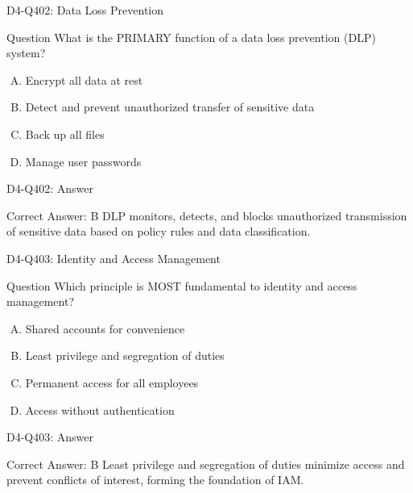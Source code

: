 \documentclass{beamer}
\begin{document}
\begin{frame}{D4-Q402: Data Loss Prevention}
	\begin{block}{Question}
		What is the PRIMARY function of a data loss prevention (DLP) system?
	\end{block}
	\begin{enumerate}[(A)]
		\item Encrypt all data at rest
		\item Detect and prevent unauthorized transfer of sensitive data
		\item Back up all files
		\item Manage user passwords
	\end{enumerate}
\end{frame}
\begin{frame}{D4-Q402: Answer}
	\begin{block}{Correct Answer: B}
		DLP monitors, detects, and blocks unauthorized transmission of sensitive data based on policy rules and data classification.
	\end{block}
\end{frame}

\begin{frame}{D4-Q403: Identity and Access Management}
	\begin{block}{Question}
		Which principle is MOST fundamental to identity and access management?
	\end{block}
	\begin{enumerate}[(A)]
		\item Shared accounts for convenience
		\item Least privilege and segregation of duties
		\item Permanent access for all employees
		\item Access without authentication
	\end{enumerate}
\end{frame}
\begin{frame}{D4-Q403: Answer}
	\begin{block}{Correct Answer: B}
		Least privilege and segregation of duties minimize access and prevent conflicts of interest, forming the foundation of IAM.
	\end{block}
\end{frame}
\end{document}
